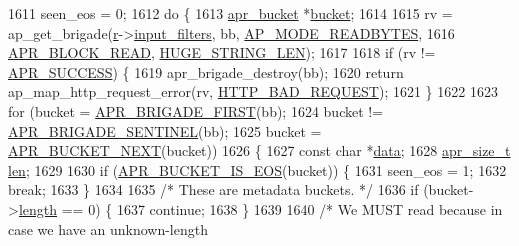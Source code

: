 \begin{DoxyCode}
1611     seen\_eos = 0;
1612     \textcolor{keywordflow}{do} \{
1613         \hyperlink{structapr__bucket}{apr\_bucket} *\hyperlink{group__APACHE__CORE__FILTER_ga6550e0bd0ee31e160be60d67874dbcbc}{bucket};
1614 
1615         rv = ap\_get\_brigade(\hyperlink{group__APACHE__CORE__CONFIG_ga091cdd45984e865a888a4f8bb8fe107a}{r}->\hyperlink{structrequest__rec_ab07868ed8240b6236a51aa1e7b198d3e}{input\_filters}, bb, 
      \hyperlink{util__filter_8h_ab570898d09fbbe5b6d838e28b90134e0a2d8e63e1da380c3909ac0a1325339de4}{AP\_MODE\_READBYTES},
1616                             \hyperlink{group__APR__Util__Bucket__Brigades_gga756973fb6392bd1026c3d96b4519776da2d983f5b7fd996434e0dded171c261d8}{APR\_BLOCK\_READ}, \hyperlink{group__APACHE__CORE__DAEMON_ga0c9dd98f46b90b5bcd4cbf75e252d0da}{HUGE\_STRING\_LEN});
1617 
1618         \textcolor{keywordflow}{if} (rv != \hyperlink{group__apr__errno_ga9ee311b7bf1c691dc521d721339ee2a6}{APR\_SUCCESS}) \{
1619             apr\_brigade\_destroy(bb);
1620             \textcolor{keywordflow}{return} ap\_map\_http\_request\_error(rv, \hyperlink{group__HTTP__Status_ga0c1fdbbb10800664989907cbd3a5a023}{HTTP\_BAD\_REQUEST});
1621         \}
1622 
1623         \textcolor{keywordflow}{for} (bucket = \hyperlink{group__APR__Util__Bucket__Brigades_gab5826a11eb6ba90786a94282f806c230}{APR\_BRIGADE\_FIRST}(bb);
1624              bucket != \hyperlink{group__APR__Util__Bucket__Brigades_ga858da66dccab1e063415678bb115788a}{APR\_BRIGADE\_SENTINEL}(bb);
1625              bucket = \hyperlink{group__APR__Util__Bucket__Brigades_ga7171f690b203d548a5b6ae0b079068d8}{APR\_BUCKET\_NEXT}(bucket))
1626         \{
1627             \textcolor{keyword}{const} \textcolor{keywordtype}{char} *\hyperlink{group__APACHE__CORE__LOG_gae4950db1dbfff8459a712737063b61aa}{data};
1628             \hyperlink{group__apr__platform_gaaa72b2253f6f3032cefea5712a27540e}{apr\_size\_t} \hyperlink{group__APACHE__CORE__LOG_gab5a43233d60ef05c5b5bf5cba3d74468}{len};
1629 
1630             \textcolor{keywordflow}{if} (\hyperlink{group__APR__Util__Bucket__Brigades_ga89b225e1c08473766eec719b985ca0d6}{APR\_BUCKET\_IS\_EOS}(bucket)) \{
1631                 seen\_eos = 1;
1632                 \textcolor{keywordflow}{break};
1633             \}
1634 
1635             \textcolor{comment}{/* These are metadata buckets. */}
1636             \textcolor{keywordflow}{if} (bucket->\hyperlink{structapr__bucket_a0898dfc78d9275187189b9a745e619bf}{length} == 0) \{
1637                 \textcolor{keywordflow}{continue};
1638             \}
1639 
1640             \textcolor{comment}{/* We MUST read because in case we have an unknown-length}

\end{DoxyCode}
